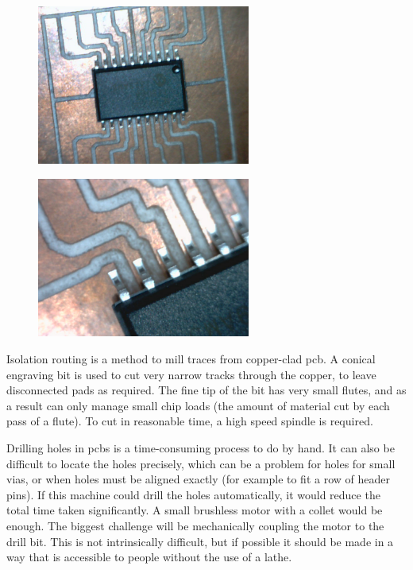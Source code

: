 \begin{figure}
\centering
\begin{minipage}{.5\textwidth}
	\centering
	\includegraphics[width=70mm]{resources/breakout.png}
	\label{breakout}
\end{minipage}%
\hfill
\begin{minipage}{.5\textwidth}
	\centering
	\includegraphics[width=70mm]{resources/breakout_closeup.png}
	\label{breakout_closeup}
\end{minipage}%
\end{figure}

Isolation routing is a method to mill traces from copper-clad pcb. A conical engraving bit is used to cut very narrow tracks through
the copper, to leave disconnected pads as required. The fine tip of the bit has very small flutes, and as a result can only manage
small chip loads (the amount of material cut by each pass of a flute). To cut in reasonable time, a high speed spindle is required.

Drilling holes in pcbs is a time-consuming process to do by hand. It can also be difficult to locate the holes precisely, which can be a problem
for holes for small vias, or when holes must be aligned exactly (for example to fit a row of header pins). If this machine could drill the holes automatically,
it would reduce the total time taken significantly. A small brushless motor with a collet would be enough. The biggest challenge
will be mechanically coupling the motor to the drill bit. This is not intrinsically difficult, but if possible it should be made in a way that
is accessible to people without the use of a lathe.

